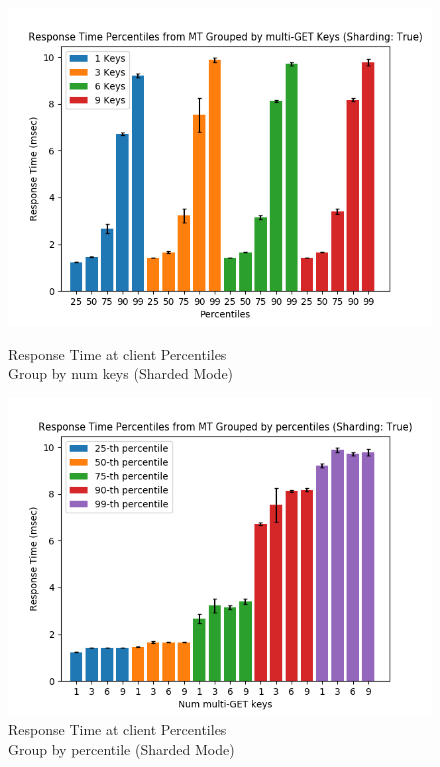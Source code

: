 \documentclass[11pt,a4paper]{article}
\begin{document}
\begin{figure}[H]
	\captionsetup{font=scriptsize,labelfont=scriptsize,justification=centering}
	\centering
	\begin{minipage}{0.5\textwidth}
		\centering
		\includegraphics[scale=0.5]{images/5_shard_True_percentiles_group_by_keys_mt.png}
		\caption{Response Time at client Percentiles \\ Group by num keys (Sharded Mode)}
	\end{minipage}\hfill
	\begin{minipage}{0.5\textwidth}
		\centering
		\includegraphics[scale=0.5]{images/5_shard_True_percentiles_group_by_percentile_mt.png}
		\caption{Response Time at client Percentiles \\ Group by percentile (Sharded Mode)}
	\end{minipage}
\end{figure}
\end{document}
